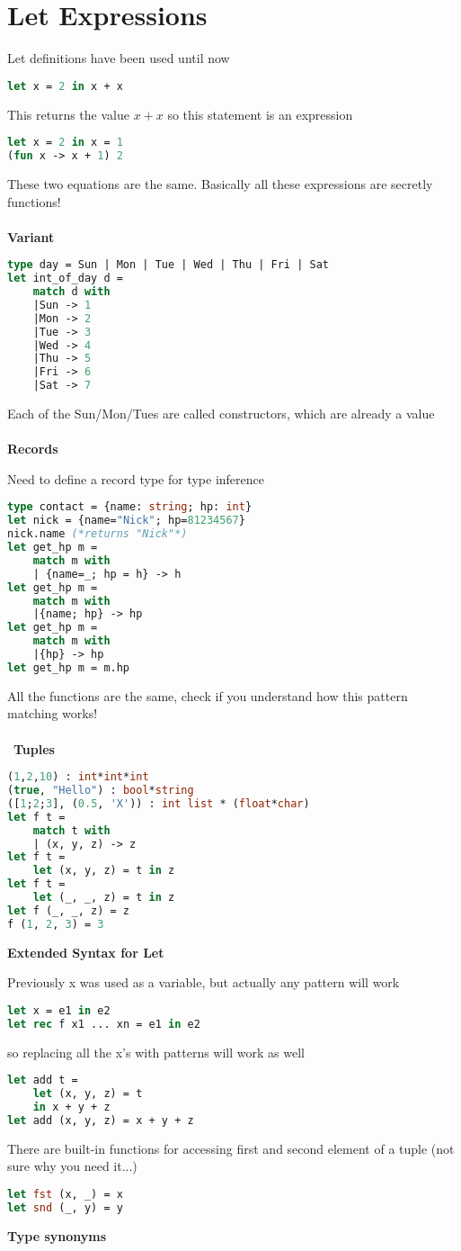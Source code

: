 \documentclass[12pt,a4paper]{article} %
\begin{document}
\section{Let Expressions}
Let definitions have been used until now
\begin{lstlisting}[language=Caml]
let x = 2 in x + x
\end{lstlisting}
This returns the value $ x+x$ so this statement is an expression
\begin{lstlisting}[language=Caml]
let x = 2 in x = 1
(fun x -> x + 1) 2
\end{lstlisting}
These two equations are the same. Basically all these expressions are secretly functions!
\\\\
\textbf{Variant}
\begin{lstlisting}[language=Caml]
type day = Sun | Mon | Tue | Wed | Thu | Fri | Sat
let int_of_day d = 
	match d with
	|Sun -> 1
	|Mon -> 2
	|Tue -> 3
	|Wed -> 4
	|Thu -> 5
	|Fri -> 6
	|Sat -> 7
\end{lstlisting}
Each of the Sun/Mon/Tues are called constructors, which are already a value
\\\\
\textbf{Records}

Need to define a record type for type inference
\begin{lstlisting}[language=Caml]
type contact = {name: string; hp: int}
let nick = {name="Nick"; hp=81234567}
nick.name (*returns "Nick"*)
let get_hp m = 
	match m with
	| {name=_; hp = h} -> h
let get_hp m = 
	match m with 
	|{name; hp} -> hp
let get_hp m = 
	match m with 
	|{hp} -> hp
let get_hp m = m.hp
\end{lstlisting}
All the functions are the same, check if you understand how this pattern matching works!
\\\\\
\textbf{Tuples}
\begin{lstlisting}[language=Caml]
(1,2,10) : int*int*int
(true, "Hello") : bool*string
([1;2;3], (0.5, 'X')) : int list * (float*char)
let f t = 
	match t with
	| (x, y, z) -> z
let f t = 
	let (x, y, z) = t in z
let f t = 
	let (_, _, z) = t in z
let f (_, _, z) = z
f (1, 2, 3) = 3
\end{lstlisting}
\textbf{Extended Syntax for Let}

Previously x was used as a variable, but actually any pattern will work
\begin{lstlisting}[language=Caml]
let x = e1 in e2
let rec f x1 ... xn = e1 in e2
\end{lstlisting}
so replacing all the x's with patterns will work as well
\begin{lstlisting}[language=Caml]
let add t = 
	let (x, y, z) = t
	in x + y + z
let add (x, y, z) = x + y + z
\end{lstlisting}
There are built-in functions for accessing first and second element of a tuple (not sure why you need it...)
\begin{lstlisting}[language=Caml]
let fst (x, _) = x
let snd (_, y) = y
\end{lstlisting}
\textbf{Type synonyms}
\end{document}
